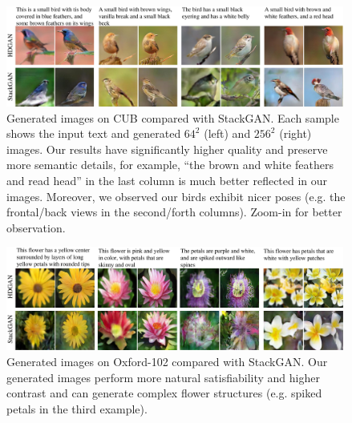 \documentclass[10pt,twocolumn,letterpaper]{article}
\begin{document}
\begin{figure}[t]
	\centering
	\includegraphics[width=0.99\textwidth]{figure/cub.pdf}
	\vspace{-.2cm}
	\caption{Generated images on CUB compared with StackGAN. Each sample shows the input text and generated $64^2$ (left) and $256^2$ (right) images. Our results have significantly higher quality and preserve more semantic details, for example, ``the brown and white feathers and read head'' in the last column is much better reflected in our images. Moreover, we observed our birds exhibit nicer poses (e.g. the frontal/back views in the second/forth columns). Zoom-in for better observation.}
	\vspace{-0.3cm}
	\label{fig:vis-cub}
\end{figure}
\begin{figure}[t]
	\centering
	\includegraphics[width=0.99\textwidth]{figure/flowers.pdf}
	\vspace{-.2cm}
	\caption{Generated images on Oxford-102 compared with StackGAN. Our generated images perform more natural satisfiability and higher contrast and can generate complex flower structures (e.g. spiked petals in the third example).} \label{fig:vis-oxford}
	\vspace{-.5cm}
\end{figure}
\end{document}
